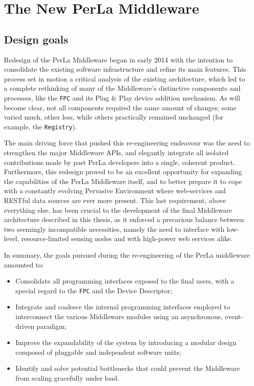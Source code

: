 \chapter{The New PerLa Middleware}
\label{cha:middleware_overview}

\section{Design goals}

Redesign of the PerLa Middleware began in early 2014 with the intention to
consolidate the existing software infrastructure and refine its main features.
This process set in motion a critical analysis of the existing architecture,
which led to a complete rethinking of many of the Middleware's distinctive
components and processes, like the \texttt{FPC} and its Plug \& Play device
addition mechanism. As will become clear, not all components required the same
amount of changes; some varied much, other less, while others practically
remained unchanged (for example, the \texttt{Registry}).

The main driving force that pushed this re-engineering endeavour was the need
to strengthen the major Middleware APIs, and elegantly integrate all isolated
contributions made by past PerLa developers into a single, coherent product.
Furthermore, this redesign proved to be an excellent opportunity for expanding
the capabilities of the PerLa Middleware itself, and to better prepare it to
cope with a constantly evolving Pervasive Environment where web-services and
RESTful data sources are ever more present. This last requirement, above
everything else, has been crucial to the development of the final Middleware
architecture described in this thesis, as it enforced a precarious balance
between two seemingly incompatible necessities, namely the need to interface
with low-level, resource-limited sensing nodes and with high-power web services
alike. 

In summary, the goals pursued during the re-engineering of the PerLa middleware
amounted to:

\begin{itemize}
    
    \item Consolidate all programming interfaces exposed to the final users,
        with a special regard to the \texttt{FPC} and the Device Descriptor;

    \item Integrate and coalesce the internal programming interfaces employed
        to interconnect the various Middleware modules using an asynchronous,
        event-driven paradigm;

    \item Improve the expandability of the system by introducing a modular
        design composed of pluggable and independent software units;

    \item Identify and solve potential bottlenecks that could prevent the
        Middleware from scaling gracefully under load.

\end{itemize}

